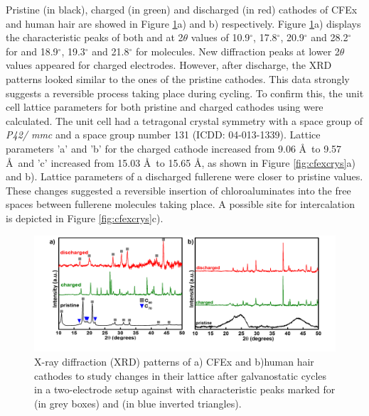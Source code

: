 \documentclass{article}
\begin{document}
Pristine (in black), charged (in green) and discharged (in red) cathodes of CFEx and human hair are showed in Figure \ref{fig:XRD}a) and b) respectively. Figure \ref{fig:XRD}a) displays the characteristic peaks of both  and  at 2$\theta$ values of 10.9$^{\circ}$, 17.8$^{\circ}$, 20.9$^{\circ}$ and 28.2$^{\circ}$ for  and 18.9$^{\circ}$, 19.3$^{\circ}$ and 21.8$^{\circ}$ for  molecules. New diffraction peaks at lower 2$\theta$ values appeared for charged electrodes. However, after discharge, the XRD patterns looked similar to the ones of the pristine cathodes. This data strongly suggests a reversible process taking place during cycling. To confirm this, the unit cell lattice parameters for both pristine and charged cathodes using  were calculated. The unit cell had a tetragonal crystal symmetry with a space group of \textit{P42/ mmc} and a space group number 131 (ICDD: 04-013-1339). Lattice parameters 'a' and 'b' for the charged cathode increased from 9.06 \AA\ to 9.57 \AA\ and 'c' increased from 15.03 \AA\ to 15.65 \AA, as shown in Figure \ref{fig:cfexcrys}a) and b). Lattice parameters of a discharged fullerene were closer to pristine values. These changes suggested a reversible insertion of chloroaluminates into the free spaces between fullerene molecules taking place. A possible site for  intercalation is depicted in Figure \ref{fig:cfexcrys}c). 

\begin{figure}
  \centering
  \includegraphics[width=\textwidth]{fig/XRD}
    \caption{X-ray diffraction (XRD) patterns of a) CFEx and b)human hair cathodes to study changes in their lattice after galvanostatic cycles in a two-electrode setup against  with characteristic peaks marked for  (in grey boxes) and  (in blue inverted triangles).}
  \label{fig:XRD}
\end{figure}
\end{document}
